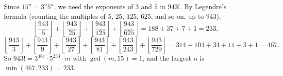 Since $15^n=3^n5^n$, we need the exponents of $3$ and $5$ in $943!$. By Legendre's formula (counting the multiples of $5$, $25$, $125$, $625$, and so on, up to $943$),
\[\left\lfloor\dfrac{943}{5}\right\rfloor+\left\lfloor\dfrac{943}{25}\right\rfloor+\left\lfloor\dfrac{943}{125}\right\rfloor+\left\lfloor\dfrac{943}{625}\right\rfloor=188+37+7+1=233,\]
\[\left\lfloor\dfrac{943}{3}\right\rfloor+\left\lfloor\dfrac{943}{9}\right\rfloor+\left\lfloor\dfrac{943}{27}\right\rfloor+\left\lfloor\dfrac{943}{81}\right\rfloor+\left\lfloor\dfrac{943}{243}\right\rfloor+\left\lfloor\dfrac{943}{729}\right\rfloor=314+104+34+11+3+1=467.\]
So $943!=3^{467}\cdot5^{233}\cdot m$ with $\gcd(m,15)=1$, and the largest $n$ is $\min(467,233)=\boxed{233}$.
